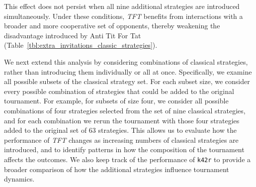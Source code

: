 \documentclass{article}
\newcommand{\TFT}{\emph{TFT}}
\begin{document}
This effect does not persist when all nine additional strategies are introduced
simultaneously. Under these conditions, \TFT{} benefits from interactions with
a broader and more cooperative set of opponents, thereby weakening the
disadvantage introduced by Anti Tit For Tat (Table~\ref{tbl:extra_invitations_classic_strategies}).

\begin{table}[!hbtp]
    \centering
    \resizebox{.65\textwidth}{!}{
    }
    \caption{\textbf{Effect of adding classical strategies to Axelrod's second tournament.}
    We examine how the results change when a single strategy from a set of
    classical strategies from the literature is added to the original
    tournament. We also consider the case in which all of these strategies are
    included simultaneously. For each scenario, we report the added strategy,
    its rank, the rank of \TFT{}, the tournament winner, and both the winner's
    average score and the overall average score of the tournament.}
    \label{tbl:extra_invitations_classic_strategies}
\end{table}

We next extend this analysis by considering combinations of classical
strategies, rather than introducing them individually or all at once.
Specifically, we examine all possible subsets of the classical strategy set.
For each subset size, we consider every possible combination of strategies that
could be added to the original tournament. For example, for subsets of size
four, we consider all possible combinations of four strategies selected from
the set of nine classical strategies, and for each combination we rerun the
tournament with those four strategies added to the original set of 63
strategies.
This allows us to evaluate how the performance of \TFT{} changes as increasing
numbers of classical strategies are introduced, and to identify patterns in how
the composition of the tournament affects the outcomes. We also keep track of
the performance of \texttt{k42r} to provide a broader comparison of how the
additional strategies influence tournament dynamics.
\end{document}
